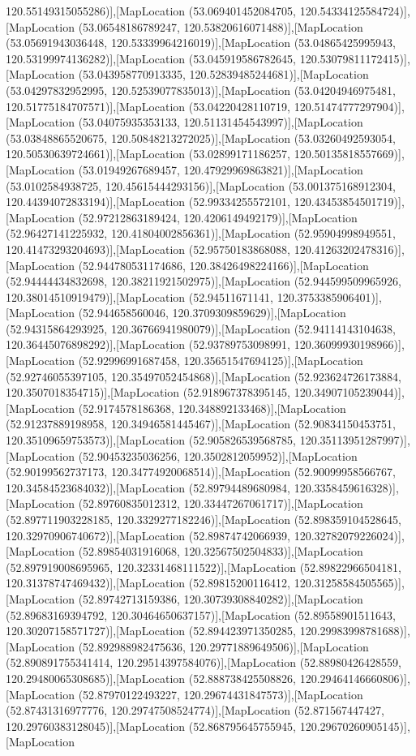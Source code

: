 120.55149315055286)],[MapLocation (53.069401452084705, 120.54334125584724)],[MapLocation (53.06548186789247, 120.53820616071488)],[MapLocation (53.05691943036448, 120.53339964216019)],[MapLocation (53.04865425995943, 120.53199974136282)],[MapLocation (53.045919586782645, 120.53079811172415)],[MapLocation (53.043958770913335, 120.52839485244681)],[MapLocation (53.04297832952995, 120.52539077835013)],[MapLocation (53.04204946975481, 120.51775184707571)],[MapLocation (53.04220428110719, 120.51474777297904)],[MapLocation (53.04075935353133, 120.51131454543997)],[MapLocation (53.03848865520675, 120.50848213272025)],[MapLocation (53.03260492593054, 120.50530639724661)],[MapLocation (53.02899171186257, 120.50135818557669)],[MapLocation (53.01949267689457, 120.47929969863821)],[MapLocation (53.0102584938725, 120.45615444293156)],[MapLocation (53.001375168912304, 120.44394072833194)],[MapLocation (52.99334255572101, 120.43453854501719)],[MapLocation (52.97212863189424, 120.4206149492179)],[MapLocation (52.96427141225932, 120.41804002856361)],[MapLocation (52.95904998949551, 120.41473293204693)],[MapLocation (52.95750183868088, 120.41263202478316)],[MapLocation (52.944780531174686, 120.38426498224166)],[MapLocation (52.94444434832698, 120.38211921502975)],[MapLocation (52.944599509965926, 120.38014510919479)],[MapLocation (52.94511671141, 120.3753385906401)],[MapLocation (52.944658560046, 120.3709309859629)],[MapLocation (52.94315864293925, 120.36766941980079)],[MapLocation (52.94114143104638, 120.36445076898292)],[MapLocation (52.93789753098991, 120.36099930198966)],[MapLocation (52.92996991687458, 120.35651547694125)],[MapLocation (52.92746055397105, 120.35497052454868)],[MapLocation (52.923624726173884, 120.3507018354715)],[MapLocation (52.918967378395145, 120.34907105239044)],[MapLocation (52.9174578186368, 120.348892133468)],[MapLocation (52.91237889198958, 120.34946581445467)],[MapLocation (52.90834150453751, 120.35109659753573)],[MapLocation (52.905826539568785, 120.35113951287997)],[MapLocation (52.90453235036256, 120.3502812059952)],[MapLocation (52.90199562737173, 120.34774920068514)],[MapLocation (52.90099958566767, 120.34584523684032)],[MapLocation (52.89794489680984, 120.3358459616328)],[MapLocation (52.89760835012312, 120.33447267061717)],[MapLocation (52.897711903228185, 120.3329277182246)],[MapLocation (52.898359104528645, 120.32970906740672)],[MapLocation (52.89874742066939, 120.32782079226024)],[MapLocation (52.89854031916068, 120.32567502504833)],[MapLocation (52.897919008695965, 120.32331468111522)],[MapLocation (52.89822966504181, 120.31378747469432)],[MapLocation (52.89815200116412, 120.31258584505565)],[MapLocation (52.89742713159386, 120.30739308840282)],[MapLocation (52.89683169394792, 120.30464650637157)],[MapLocation (52.89558901511643, 120.30207158571727)],[MapLocation (52.894423971350285, 120.29983998781688)],[MapLocation (52.892988982475636, 120.29771889649506)],[MapLocation (52.890891755341414, 120.29514397584076)],[MapLocation (52.88980426428559, 120.29480065308685)],[MapLocation (52.888738425508826, 120.29464146660806)],[MapLocation (52.87970122493227, 120.29674431847573)],[MapLocation (52.87431316977776, 120.29747508524774)],[MapLocation (52.871567447427, 120.29760383128045)],[MapLocation (52.868795645755945, 120.29670260905145)],[MapLocation 